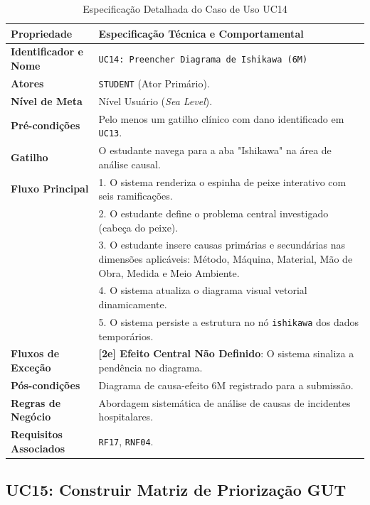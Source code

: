 \begin{table}[!ht]
\centering
\caption{Especificação Detalhada do Caso de Uso UC14}
\label{tab_uc14}
\footnotesize
\begin{tabularx}{\textwidth}{p{3.5cm} X}
\toprule
\textbf{Propriedade} & \textbf{Especificação Técnica e Comportamental} \\
\midrule
\textbf{Identificador e Nome} & \texttt{UC14: Preencher Diagrama de Ishikawa (6M)} \\
\textbf{Atores} & \texttt{STUDENT} (Ator Primário). \\
\textbf{Nível de Meta} & Nível Usuário (\textit{Sea Level}). \\
\textbf{Pré-condições} & Pelo menos um gatilho clínico com dano identificado em \texttt{UC13}. \\
\textbf{Gatilho} & O estudante navega para a aba "Ishikawa" na área de análise causal. \\
\textbf{Fluxo Principal} & 
1. O sistema renderiza o espinha de peixe interativo com seis ramificações.\\
& 2. O estudante define o problema central investigado (cabeça do peixe).\\
& 3. O estudante insere causas primárias e secundárias nas dimensões aplicáveis: Método, Máquina, Material, Mão de Obra, Medida e Meio Ambiente.\\
& 4. O sistema atualiza o diagrama visual vetorial dinamicamente.\\
& 5. O sistema persiste a estrutura no nó \texttt{ishikawa} dos dados temporários. \\
\textbf{Fluxos de Exceção} & 
\textbf{[2e] Efeito Central Não Definido}: O sistema sinaliza a pendência no diagrama. \\
\textbf{Pós-condições} & Diagrama de causa-efeito 6M registrado para a submissão. \\
\textbf{Regras de Negócio} & Abordagem sistemática de análise de causas de incidentes hospitalares. \\
\textbf{Requisitos Associados} & \texttt{RF17}, \texttt{RNF04}. \\
\bottomrule
\end{tabularx}
\end{table}

\subsection{UC15: Construir Matriz de Priorização GUT}
\label{uc15_especificacao}

